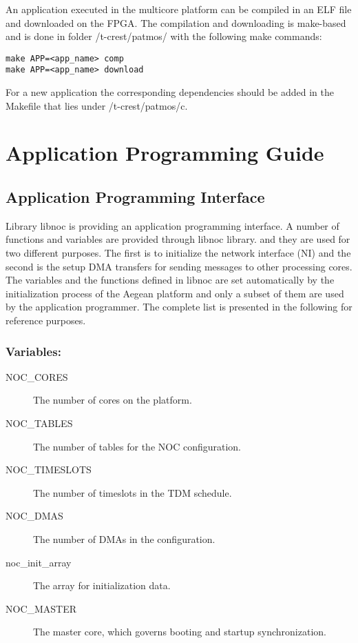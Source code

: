 \documentclass[a4paper,fontsize=10pt,twoside,DIV15,BCOR12mm,headinclude=true,footinclude=false,pagesize,bibtotoc]{scrbook}
\begin{document}
An application executed in the multicore platform can be compiled in an ELF file and downloaded on the FPGA.
The compilation and downloading is make-based and is done in folder /t-crest/patmos/ with the following make commands:

\begin{verbatim}
make APP=<app_name> comp
make APP=<app_name> download
\end{verbatim}

For a new application the corresponding dependencies should be added in the Makefile that
lies under /t-crest/patmos/c.



\section{Application Programming Guide}
\label{sec:apg}

\subsection{Application Programming Interface}

Library libnoc is providing an application programming interface. A number of functions and variables are provided through libnoc library. 
and they are used for two different purposes. The first is to initialize the network interface (NI) and the second is the setup DMA transfers 
for sending messages to other processing cores. The variables and the functions defined in libnoc are set automatically by the initialization process 
of the Aegean platform and only a subset of them are used by the application programmer. The complete list is presented in the following for reference
purposes.


\subsubsection{Variables:}
\begin{description}
\item[NOC\_CORES] The number of cores on the platform. 
\item[NOC\_TABLES] The number of tables for the NOC configuration.
\item[NOC\_TIMESLOTS] The number of timeslots in the TDM schedule. 
\item[NOC\_DMAS]	The number of DMAs in the configuration. 
\item[noc\_init\_array] The array for initialization data. 
\item[NOC\_MASTER] The master core, which governs booting and startup synchronization. 
\end{description}
\end{document}
